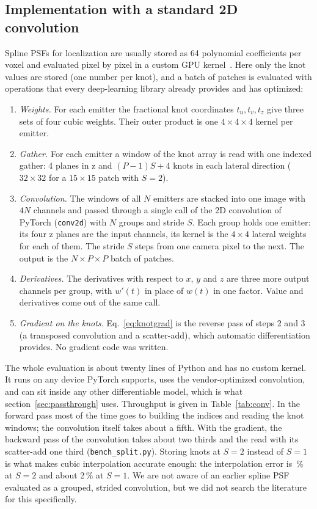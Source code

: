 \documentclass[11pt,a4paper]{article}
\begin{document}
\subsection{Implementation with a standard 2D convolution}
\label{sec:impl}

Spline PSFs for localization are usually stored as 64 polynomial coefficients per voxel and evaluated pixel by
pixel in a custom GPU kernel~\cite{cspline}. Here only the knot values are stored (one number per knot), and a
batch of patches is evaluated with operations that every deep-learning library already provides and has
optimized:
\begin{enumerate}\setlength\itemsep{0pt}
\item \emph{Weights.} For each emitter the fractional knot coordinates $t_u,t_v,t_z$ give three sets of four
cubic weights. Their outer product is one $4\times4\times4$ kernel per emitter.
\item \emph{Gather.} For each emitter a window of the knot array is read with one indexed gather: 4 planes in z
and $(P-1)S+4$ knots in each lateral direction ($32\times32$ for a $15\times15$ patch with $S=2$).
\item \emph{Convolution.} The windows of all $N$ emitters are stacked into one image with $4N$ channels and
passed through a single call of the 2D convolution of PyTorch (\texttt{conv2d}) with $N$ groups and stride $S$.
Each group holds one emitter: its four z planes are the input channels, its kernel is the $4\times4$ lateral
weights for each of them. The stride $S$ steps from one camera pixel to the next. The output is the
$N\times P\times P$ batch of patches.
\item \emph{Derivatives.} The derivatives with respect to $x$, $y$ and $z$ are three more output channels per
group, with $w'(t)$ in place of $w(t)$ in one factor. Value and derivatives come out of the same call.
\item \emph{Gradient on the knots.} Eq.~\eqref{eq:knotgrad} is the reverse pass of steps 2 and 3 (a transposed
convolution and a scatter-add), which automatic differentiation provides. No gradient code was written.
\end{enumerate}
The whole evaluation is about twenty lines of Python and has no custom kernel. It runs on any device PyTorch
supports, uses the vendor-optimized convolution, and can sit inside any other differentiable model, which is
what section~\ref{sec:passthrough} uses. Throughput is given in Table~\ref{tab:conv}. In the forward pass most of the time goes to building the indices and reading the knot windows; the convolution itself takes about a fifth. With the gradient, the backward pass of the convolution takes about two thirds and the read with its scatter-add one third (\texttt{bench\_split.py}). Storing knots at $S=2$ instead of
$S=1$ is what makes cubic interpolation accurate enough: the interpolation error is \splineerr\,\% at $S=2$ and
about 2\,\% at $S=1$. We are not aware of an earlier spline PSF evaluated as a grouped, strided convolution, but
we did not search the literature for this specifically.
\end{document}
